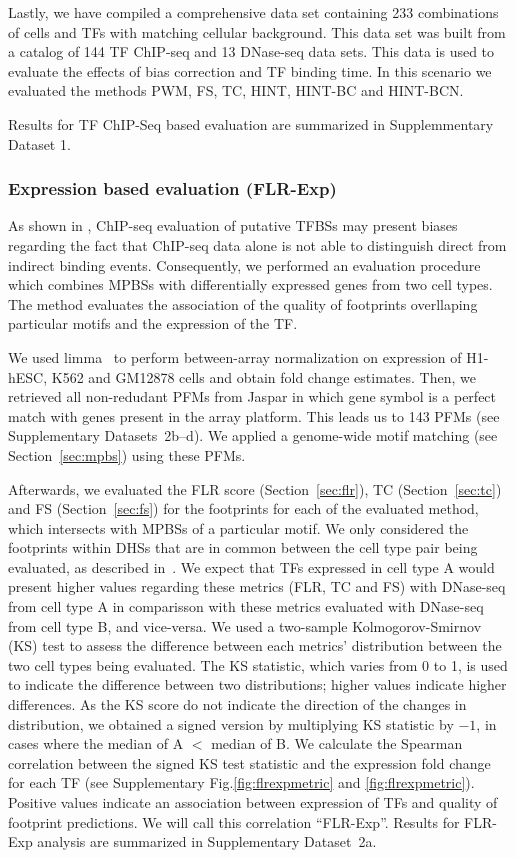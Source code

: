 \documentclass[11pt]{article}
\begin{document}
 Lastly, we have compiled a comprehensive data set containing 233 combinations of cells and TFs with matching cellular background. This data set was built from a catalog of 144 TF ChIP-seq and 13 DNase-seq data sets. This data is used to evaluate the effects of bias correction and TF binding time. In this scenario we evaluated the methods PWM, FS, TC, HINT, HINT-BC and HINT-BCN.

Results for TF ChIP-Seq based evaluation are summarized in Supplemmentary Dataset 1.

\subsubsection{Expression based evaluation (FLR-Exp)}
\label{sec:flrexp}

As shown in \cite{yardimci2014}, ChIP-seq evaluation of putative TFBSs may present biases regarding the fact that ChIP-seq data alone is not able to distinguish direct from indirect binding events. Consequently, we performed an evaluation procedure which combines MPBSs with differentially expressed genes from two cell types. The method evaluates the association of the quality of footprints overllaping particular motifs and the expression of the TF.

We used limma~\citep{ritchie2015} to perform between-array normalization on expression of H1-hESC, K562 and GM12878 cells and obtain fold change estimates. Then, we retrieved all non-redudant PFMs from Jaspar in which gene symbol is a perfect match with genes present in the array platform. This leads us to 143 PFMs (see Supplementary Datasets~2b--d). We applied a genome-wide motif matching (see Section~\ref{sec:mpbs}) using these PFMs.

Afterwards, we evaluated the FLR score (Section~\ref{sec:flr}), TC (Section~\ref{sec:tc}) and FS (Section~\ref{sec:fs}) for the footprints for each of the evaluated method, which intersects with MPBSs of a particular motif. We only considered the footprints within DHSs that are in common between the cell type pair being evaluated, as described in~\cite{yardimci2014}. We expect that TFs expressed in cell type A would present higher values regarding these metrics (FLR, TC and FS) with DNase-seq from cell type A in comparisson with these metrics evaluated with DNase-seq from cell type B, and vice-versa. We used a two-sample Kolmogorov-Smirnov (KS) test to assess the difference between each metrics' distribution between the two cell types being evaluated. The KS statistic, which varies from 0 to 1, is used to indicate the difference between two distributions; higher values indicate higher differences. As the KS score do not indicate the direction of the changes in distribution, we obtained a signed version by multiplying KS statistic by $-1$, in cases where the median of A $<$ median of B. We calculate the Spearman correlation between the signed KS test statistic and the expression fold change for each TF (see Supplementary Fig.\ref{fig:flrexpmetric} and \ref{fig:flrexpmetric}). Positive values indicate an association between expression of TFs and quality of footprint predictions. We will call this correlation ``FLR-Exp''. Results for FLR-Exp analysis are summarized in Supplementary Dataset~2a.
\end{document}

